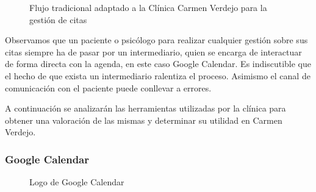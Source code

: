 \begin{figure}[H]
    \caption{Flujo tradicional adaptado a la Clínica Carmen Verdejo para la gestión de citas}
    \label{fig:flujo-tradicional}
\end{figure}

Observamos que un paciente o psicólogo para realizar cualquier gestión sobre sus citas siempre ha de pasar por un intermediario, quien se encarga de interactuar de forma directa con la agenda, en este caso Google Calendar. Es indiscutible que el hecho de que exista un intermediario ralentiza el proceso. Asimismo el canal de comunicación con el paciente puede conllevar a errores. \bigskip

A continuación se analizarán las herramientas utilizadas por la clínica para obtener una valoración de las mismas y determinar su utilidad en Carmen Verdejo.

\subsubsection*{Google Calendar}

\begin{figure}[H]
    \caption{Logo de Google Calendar}
    \label{fig:google-calendar}
\end{figure}

